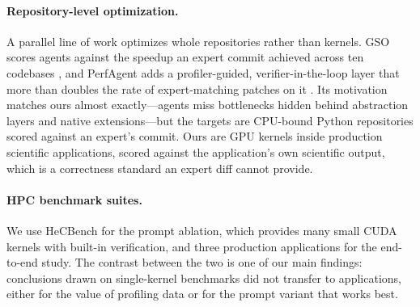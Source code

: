\paragraph{Repository-level optimization.}
A parallel line of work optimizes whole repositories rather than kernels. GSO scores agents against the
speedup an expert commit achieved across ten codebases \cite{shetty2025gso}, and PerfAgent adds a
profiler-guided, verifier-in-the-loop layer that more than doubles the rate of expert-matching patches
on it \cite{deng2026perfagent}. Its motivation matches ours almost exactly---agents miss bottlenecks
hidden behind abstraction layers and native extensions---but the targets are CPU-bound Python
repositories scored against an expert's commit. Ours are GPU kernels inside production scientific
applications, scored against the application's own scientific output, which is a correctness standard
an expert diff cannot provide.

\paragraph{HPC benchmark suites.}
We use HeCBench \cite{jin2023hecbench} for the prompt ablation, which provides many small CUDA kernels
with built-in verification, and three production applications for the end-to-end study. The contrast
between the two is one of our main findings: conclusions drawn on single-kernel benchmarks did not
transfer to applications, either for the value of profiling data or for the prompt variant that works
best.
